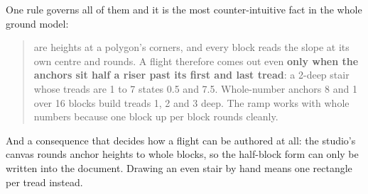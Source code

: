 One rule governs all of them and it is the most counter-intuitive fact in the whole
ground model:

\begin{quote}
 are heights at a polygon's corners, and every block reads the
slope at its own centre and rounds. A flight therefore comes out even \textbf{only
when the anchors sit half a riser past its first and last tread}: a 2-deep stair
whose treads are 1 to 7 states 0.5 and 7.5. Whole-number anchors 8 and 1 over 16
blocks build treads 1, 2 and 3 deep. The ramp works with whole numbers because one
block up per block rounds cleanly.
\end{quote}

And a consequence that decides how a flight can be authored at all: the studio's
canvas rounds anchor heights to whole blocks, so the half-block form can only be
written into the document. Drawing an even stair by hand means one rectangle per
tread instead.
